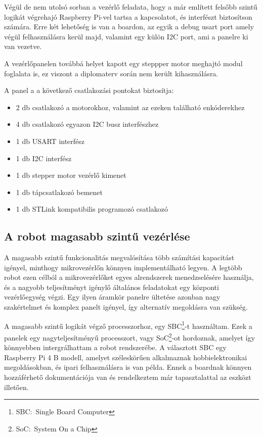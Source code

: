 Végül de nem utolsó sorban a vezérlő feladata, hogy a már említett felsőbb szintű
logikát végrehajó Raspberry Pi-vel tartsa a kapcsolatot, és interfészt
biztosítson számára. Erre két lehetőség is van a boardon, az egyik a debug usart
port amely végül felhasználásra kerül majd, valamint egy külön I2C port, ami a
panelre ki van vezetve.

A vezérlőpanelen továbbá helyet kapott egy steppper motor meghajtó modul
foglalata is, ez viszont a diplomaterv során nem került kihasználásra.


A panel a a következő csatlakozási pontokat biztosítja:

\begin{itemize}
\item 2 db csatlakozó a motorokhoz, valamint az ezeken található enkóderekhez
\item 4 db csatlakozó egyazon I2C busz interfészhez
\item 1 db USART interfész
\item 1 db I2C interfész
\item 1 db stepper motor vezérlő kimenet
\item 1 db tápcsatlakozó bemenet
\item 1 db STLink kompatibilis programozó csatlakozó
\end{itemize}


\subsection{A robot magasabb szintű vezérlése}
A magasabb szintű funkcionalitás megvalósítása több számítási kapacitást igényel,
minthogy mikrovezérlőn könnyen implementálható legyen. A legtöbb robot ezen
célból a mikrovezérlőket egyes alrendszerek menedzselésére használja, és a
nagyobb teljesítményt igénylő általános feladatokat egy központi vezérlőegység
végzi. Egy ilyen áramkör panelre ültetése azonban nagy szakértelmet és komplex
panelt igényel, így alternatív megoldásra van szükség.

A magasabb szintű logikát végző processzorhoz, egy SBC\footnote{SBC:~Single Board
Computer}-t használtam. Ezek a panelek egy nagyteljesítményű processzort, vagy
SoC\footnote{SoC:~System On a Chip}-ot hordoznak, amelyet így könnyebben
intergrálhattam a robot rendszerébe. A választott SBC egy Raspberry Pi 4 B
modell, amelyet széleskörűen alkalmaznak hobbielektronikai megoldásokban, és
ipari felhasználásra is van példa. Ennek a boardnak könnyen hozzáférhető
dokumentációja van és rendelkeztem már tapasztalattal az eszközt illetően.

